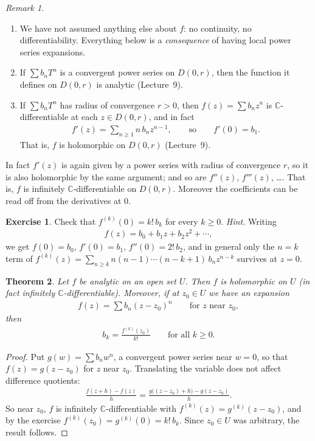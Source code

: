 \documentclass[11pt]{article}
\theoremstyle{plain}
\newtheorem{theorem}{Theorem}[section]
\theoremstyle{definition}
\newtheorem{exercise}[theorem]{Exercise}
\theoremstyle{remark}
\newtheorem*{remark}{Remark}
\numberwithin{equation}{section}
\newcommand{\be}{\begin{eqnarray}}
\newcommand{\ee}{\end{eqnarray}}
\newcommand{\C}{\mathbb{C}}
\begin{document}
\begin{remark}\leavevmode
\begin{enumerate}[label=(\arabic*)]
  \item We have not assumed anything else about $f$: no continuity, no
  differentiability. Everything below is a \emph{consequence} of having local
  power series expansions.
  \item If $\sum b_nT^n$ is a convergent power series on $D(0,r)$, then the
  function it defines on $D(0,r)$ is analytic (Lecture~9).
  \item If $\sum b_nT^n$ has radius of convergence $r>0$, then
  $f(z)=\sum b_nz^n$ is $\C$-differentiable at each $z\in D(0,r)$, and in fact
  \be
   f'(z)=\sum_{n\geq1}n\,b_nz^{n-1},\qquad\text{so}\qquad f'(0)=b_1.
  \ee
  That is, $f$ is holomorphic on $D(0,r)$ (Lecture~9).
\end{enumerate}
\end{remark}

In fact $f'(z)$ is again given by a power series with radius of
convergence $r$, so it is also holomorphic by the same argument; and so are
$f''(z)$, $f'''(z)$, \dots. That is, $f$ is infinitely
$\C$-differentiable on $D(0,r)$. Moreover the coefficients can be read off
from the derivatives at $0$.

\begin{exercise}
Check that $f^{(k)}(0)=k!\,b_k$ for every $k\geq0$. \emph{Hint.} Writing
\be
 f(z)=b_0+b_1z+b_2z^2+\cdots,
\ee
we get $f(0)=b_0$, $f'(0)=b_1$, $f''(0)=2!\,b_2$, and in general only the
$n=k$ term of $f^{(k)}(z)=\sum_{n\geq k}n(n-1)\cdots(n-k+1)\,b_nz^{n-k}$
survives at $z=0$.
\end{exercise}

\begin{theorem}
\label{thm:analytic-hol}
Let $f$ be analytic on an open set $U$. Then $f$ is holomorphic on $U$ (in
fact infinitely $\C$-differentiable). Moreover, if at $z_0\in U$ we have an
expansion
\be
 f(z)=\sum b_n(z-z_0)^n\qquad\text{for $z$ near $z_0$},
\ee
then
\be
 b_k=\frac{f^{(k)}(z_0)}{k!}\qquad\text{for all }k\geq0.
 \label{eq:taylor-coeff}
\ee
\end{theorem}

\begin{proof}
Put $g(w)=\sum b_nw^n$, a convergent power series near $w=0$, so that
$f(z)=g(z-z_0)$ for $z$ near $z_0$. Translating the variable does not
affect difference quotients:
\be
 \frac{f(z+h)-f(z)}{h}=\frac{g\bigl((z-z_0)+h\bigr)-g(z-z_0)}{h}.
\ee
So near $z_0$, $f$ is infinitely $\C$-differentiable with
$f^{(k)}(z)=g^{(k)}(z-z_0)$, and by the exercise
$f^{(k)}(z_0)=g^{(k)}(0)=k!\,b_k$. Since $z_0\in U$ was arbitrary, the result
follows.
\end{proof}
\end{document}
